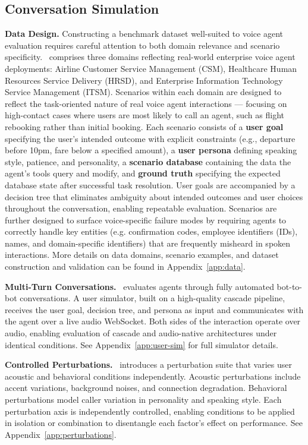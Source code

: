 \subsection{Conversation Simulation}
\label{sec:conversation-simulation}
\textbf{Data Design.} Constructing a benchmark dataset well-suited to voice agent evaluation requires careful attention to both domain relevance and scenario specificity. \framework~comprises three domains reflecting real-world enterprise voice agent deployments: Airline Customer Service Management (CSM), Healthcare Human Resources Service Delivery (HRSD), and Enterprise Information Technology Service Management (ITSM). Scenarios within each domain are designed to reflect the task-oriented nature of real voice agent interactions — focusing on high-contact cases where users are most likely to call an agent, such as flight rebooking rather than initial booking. Each scenario consists of a \textbf{user goal} specifying the user's intended outcome with explicit constraints (e.g., departure before 10pm, fare below a specified amount), a \textbf{user persona} defining speaking style, patience, and personality, a \textbf{scenario database} containing the data the agent's tools query and modify, and \textbf{ground truth} specifying the expected database state after successful task resolution. User goals are accompanied by a decision tree that eliminates ambiguity about intended outcomes and user choices throughout the conversation, enabling repeatable evaluation. Scenarios are further designed to surface voice-specific failure modes by requiring agents to correctly handle key entities (e.g. confirmation codes, employee identifiers (IDs), names, and domain-specific identifiers) that are frequently misheard in spoken interactions. More details on data domains, scenario examples, and dataset construction and validation can be found in Appendix~\ref{app:data}. 

\textbf{Multi-Turn Conversations.} \framework~evaluates agents through fully automated bot-to-bot conversations. A user simulator, built on a high-quality cascade pipeline, receives the user goal, decision tree, and persona as input and communicates with the agent over a live audio WebSocket. Both sides of the interaction operate over audio, enabling evaluation of cascade and audio-native architectures under identical conditions. See Appendix~\ref{app:user-sim} for full simulator details.

\textbf{Controlled Perturbations.} \framework~introduces a perturbation suite that varies user acoustic and behavioral conditions independently. Acoustic perturbations include accent variations, background noises, and connection degradation. Behavioral perturbations model caller variation in personality and speaking style. Each perturbation axis is independently controlled, enabling conditions to be applied in isolation or combination to disentangle each factor's effect on performance. See Appendix~\ref{app:perturbations}.

